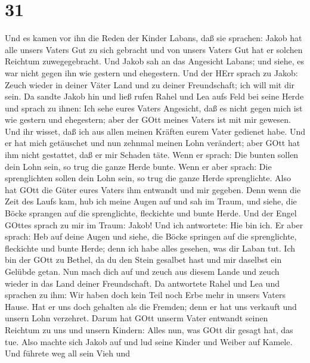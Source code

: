 \hypertarget{section-30}{%
\section{31}\label{section-30}}

 Und es kamen vor ihn die Reden der Kinder Labans, daß sie
sprachen: Jakob hat alle unsers Vaters Gut zu sich gebracht und von
unsers Vaters Gut hat er solchen Reichtum zuwegegebracht. 
Und Jakob sah an das Angesicht Labans; und siehe, es war nicht gegen ihn
wie gestern und ehegestern.  Und der HErr sprach zu Jakob:
Zeuch wieder in deiner Väter Land und zu deiner Freundschaft; ich will
mit dir sein.  Da sandte Jakob hin und ließ rufen Rahel und
Lea aufs Feld bei seine Herde  und sprach zu ihnen: Ich sehe
eures Vaters Angesicht, daß es nicht gegen mich ist wie gestern und
ehegestern; aber der GOtt meines Vaters ist mit mir gewesen.
 Und ihr wisset, daß ich aus allen meinen Kräften eurem
Vater gedienet habe.  Und er hat mich getäuschet und nun
zehnmal meinen Lohn verändert; aber GOtt hat ihm nicht gestattet, daß er
mir Schaden täte.  Wenn er sprach: Die bunten sollen dein
Lohn sein, so trug die ganze Herde bunte. Wenn er aber sprach: Die
sprenglichten sollen dein Lohn sein, so trug die ganze Herde
sprenglichte.  Also hat GOtt die Güter eures Vaters ihm
entwandt und mir gegeben.  Denn wenn die Zeit des Laufs
kam, hub ich meine Augen auf und sah im Traum, und siehe, die Böcke
sprangen auf die sprenglichte, fleckichte und bunte Herde. 
Und der Engel GOttes sprach zu mir im Traum: Jakob! Und ich antwortete:
Hie bin ich.  Er aber sprach: Heb auf deine Augen und
siehe, die Böcke springen auf die sprenglichte, fleckichte und bunte
Herde; denn ich habe alles gesehen, was dir Laban tut.  Ich
bin der GOtt zu Bethel, da du den Stein gesalbet hast und mir daselbst
ein Gelübde getan. Nun mach dich auf und zeuch aus diesem Lande und
zeuch wieder in das Land deiner Freundschaft.  Da
antwortete Rahel und Lea und sprachen zu ihm: Wir haben doch kein Teil
noch Erbe mehr in unsers Vaters Hause.  Hat er uns doch
gehalten als die Fremden; denn er hat uns verkauft und unsern Lohn
verzehret.  Darum hat GOtt unserm Vater entwandt seinen
Reichtum zu uns und unsern Kindern: Alles nun, was GOtt dir gesagt hat,
das tue.  Also machte sich Jakob auf und lud seine Kinder
und Weiber auf Kamele.  Und führete weg all sein Vieh und
